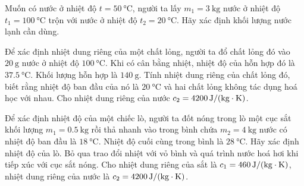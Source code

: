 \begin{ex}
Muốn có nước ở nhiệt độ $t = \SI{50}{\celsius}$, người ta lấy $m_1 = \SI{3}{\kilogram}$ nước ở nhiệt độ $t_1 = \SI{100}{\celsius}$ trộn với nước ở nhiệt độ $t_2 =\SI{20}{\celsius}$. Hãy xác định khối lượng nước lạnh cần dùng.
	
\end{ex}
\begin{ex}
Để xác định nhiệt dung riêng của một chất lỏng, người ta đổ chất lỏng đó vào $\SI{20}{\gram}$ nước ở nhiệt độ $\SI{100}{\celsius}$. Khi có cân bằng nhiệt, nhiệt độ của hỗn hợp đó là $\SI{37.5}{\celsius}$. Khối lượng hỗn hợp là $\SI{140}{\gram}$. Tính nhiệt dung riêng của chất lỏng đó, biết rằng nhiệt độ ban đầu của nó là $\SI{20}{\celsius}$ và hai chất lỏng không tác dụng hoá học với nhau. Cho nhiệt dung riêng của nước $c_2=\SI{4200}{\joule/\left(\kilogram\cdot\kelvin\right)}$.
	
\end{ex}
\begin{ex}
	Để xác định nhiệt độ của một chiếc lò, người ta đốt nóng trong lò một cục sắt khối lượng $m_1=\SI{0.5}{\kilogram}$ rồi thả nhanh vào trong bình chứa $m_2=\SI{4}{\kilogram}$ nước có nhiệt độ ban đầu là $\SI{18}{\celsius}$. Nhiệt độ cuối cùng trong bình là $\SI{28}{\celsius}$. Hãy xác định nhiệt độ của lò. Bỏ qua trao đổi nhiệt với vỏ bình và quá trình nước hoá hơi khi tiếp xúc với cục sắt nóng. Cho nhiệt dung riêng của sắt là $c_1=\SI{460}{\joule/\left(\kilogram\cdot\kelvin\right)}$, nhiệt dung riêng của nước là $c_2=\SI{4200}{\joule/\left(\kilogram\cdot\kelvin\right)}$.
	
\end{ex}
